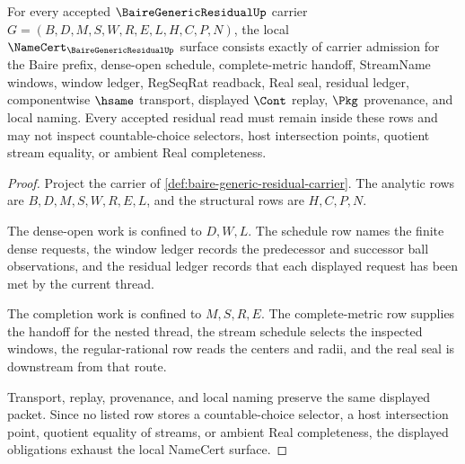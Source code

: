 \begin{theorem}
\label{thm:baire-generic-residual-namecert-obligations}
For every accepted $\BaireGenericResidualUp$ carrier $G=(B,D,M,S,W,R,E,L,H,C,P,N)$, the local $\NameCert_{\BaireGenericResidualUp}$ surface consists exactly of carrier admission for the Baire prefix, dense-open schedule, complete-metric handoff, StreamName windows, window ledger, RegSeqRat readback, Real seal, residual ledger, componentwise $\hsame$ transport, displayed $\Cont$ replay, $\Pkg$ provenance, and local naming. Every accepted residual read must remain inside these rows and may not inspect countable-choice selectors, host intersection points, quotient stream equality, or ambient Real completeness.
\end{theorem}
\begin{proof}
Project the carrier of \autoref{def:baire-generic-residual-carrier}. The analytic rows are $B,D,M,S,W,R,E,L$, and the structural rows are $H,C,P,N$.

The dense-open work is confined to $D,W,L$. The schedule row names the finite dense requests, the window ledger records the predecessor and successor ball observations, and the residual ledger records that each displayed request has been met by the current thread.

The completion work is confined to $M,S,R,E$. The complete-metric row supplies the handoff for the nested thread, the stream schedule selects the inspected windows, the regular-rational row reads the centers and radii, and the real seal is downstream from that route.

Transport, replay, provenance, and local naming preserve the same displayed packet. Since no listed row stores a countable-choice selector, a host intersection point, quotient equality of streams, or ambient Real completeness, the displayed obligations exhaust the local NameCert surface.
\end{proof}

